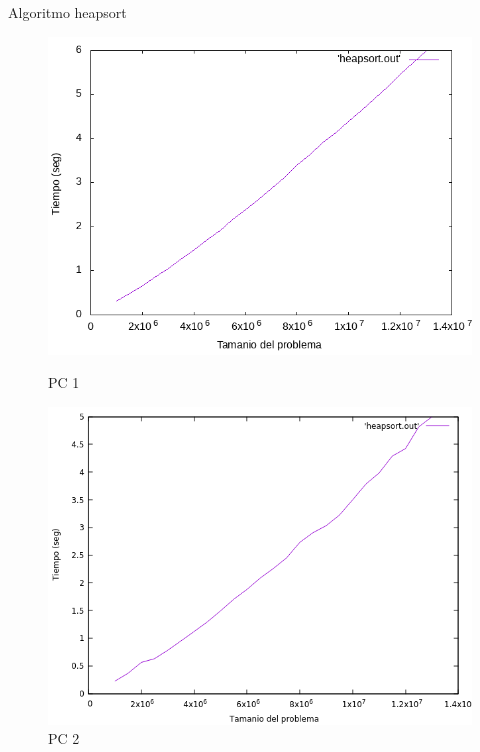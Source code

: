 \documentclass{beamer}
\begin{document}
\begin{frame}[fragile]{Algoritmo heapsort}
\begin{figure}[H]
\centering
\begin{minipage}{.5\textwidth}
  \centering
  \includegraphics[width=\linewidth]{empirica_heapsort.png}
   \caption*{PC 1}
\end{minipage}%
\begin{minipage}{.5\textwidth}
  \centering
  \includegraphics[width=\linewidth]{empirica_heapsort_2.png}
  \caption*{PC 2}
\end{minipage}
\end{figure}
\end{frame}
\end{document}
